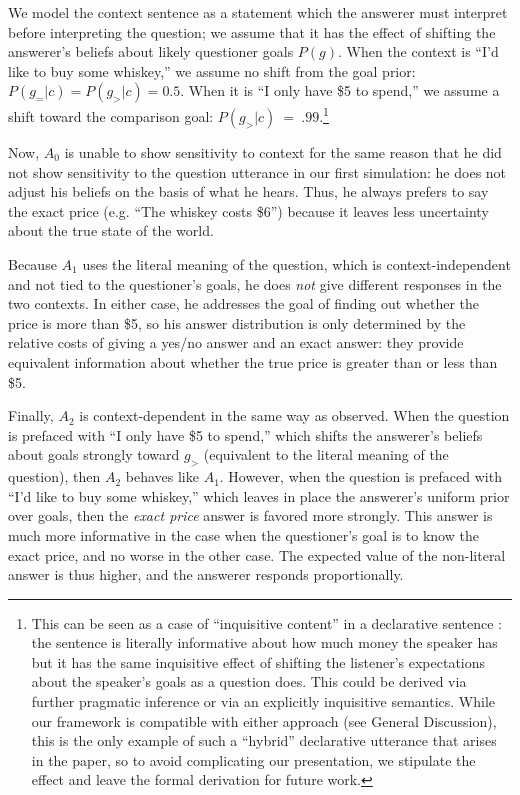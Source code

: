 \documentclass[11pt, floatsintext]{apa6}
\begin{document}
We model the context sentence as a statement which the answerer must interpret before interpreting the question; we assume that it has the effect of shifting the answerer's beliefs about likely questioner goals $P(g)$. When the context is ``I'd like to buy some whiskey,'' we assume no shift from the goal prior: $P(g_= | c) = P(g_> | c) = 0.5$. When it is ``I only have \$5 to spend,'' we assume a shift toward the comparison goal: $P(g_> | c)~=~.99$.\footnote{This can be seen as a case of ``inquisitive content'' in a declarative sentence \cite{ciardelli2018inquisitive}: the sentence is literally informative about how much money the speaker has but it has the same inquisitive effect of shifting the listener's expectations about the speaker's goals as a question does. This could be derived via further pragmatic inference or via an explicitly inquisitive semantics. While our framework is compatible with either approach (see General Discussion), this is the only example of such a ``hybrid'' declarative utterance that arises in the paper, so to avoid complicating our presentation, we stipulate the effect and leave the formal derivation for future work.}

Now, $A_0$ is unable to show sensitivity to context for the same reason that he did not show sensitivity to the question utterance in our first simulation: he does not adjust his beliefs on the basis of what he hears. Thus, he always prefers to say the exact price (e.g. ``The whiskey costs \$6'') because it leaves less uncertainty about the true state of the world.

Because $A_1$ uses the literal meaning of the question, which is context-independent and not tied to the questioner's goals, he does \emph{not} give different responses in the two contexts. 
In either case, he addresses the goal of finding out whether the price is more than \$5, so his answer distribution is only determined by the relative costs of giving a yes/no answer and an exact answer: they provide equivalent information about whether the true price is greater than or less than \$5. 

Finally, $A_2$ is context-dependent in the same way as  observed. 
When the question is prefaced with ``I only have \$5 to spend,'' which shifts the answerer's beliefs about goals strongly toward $g_>$ (equivalent to the literal meaning of the question), then $A_2$ behaves like $A_1$. 
However, when the question is prefaced with ``I'd like to buy some whiskey,'' which leaves in place the answerer's uniform prior over goals, then the \emph{exact price} answer is favored more strongly. This answer is much more informative in the case when the questioner's goal is to know the exact price, and no worse in the other case. The expected value of the non-literal answer is thus higher, and the answerer responds proportionally. 
\end{document}

